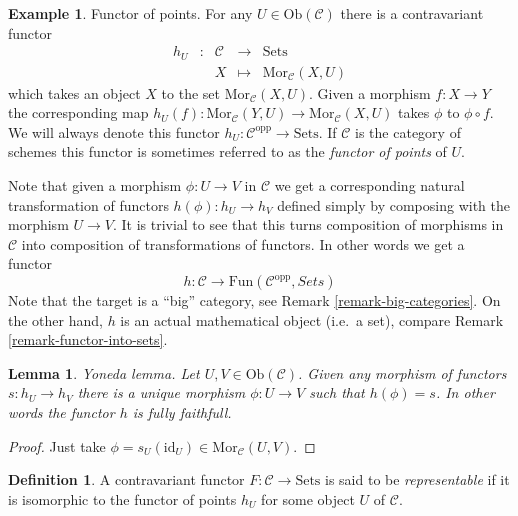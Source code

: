 \documentclass{amsart}
\newtheorem{lemma}[theorem]{Lemma}
\theoremstyle{definition}
\newtheorem{definition}[theorem]{Definition}
\newtheorem{example}[theorem]{Example}
\theoremstyle{remark}
\numberwithin{equation}{subsection}
\begin{document}
\begin{example}
\label{example-hom-functor}
Functor of points.
For any $U\in \text{Ob}(\mathcal{C})$ there is a contravariant
functor 
$$
\begin{matrix}
h_U & : & \mathcal{C} 
&
\longrightarrow
&
\text{Sets} \\
&&
X
&
\longmapsto
&
\text{Mor}_{\mathcal{C}}(X,U) 
\end{matrix}
$$
which takes an object $X$ to the set
$\text{Mor}_{\mathcal{C}}(X,U)$.
Given a morphism $f\colon X\to Y$ the corresponding map
$h_U(f)\colon
\text{Mor}_{\mathcal{C}}(Y,U)\to \text{Mor}_{\mathcal{C}}(X,U)$ takes
$\phi$ to $\phi\circ f$. We will always denote
this functor $h_U : \mathcal{C}^{\text{opp}} \to \text{Sets}$.
If $\mathcal{C}$ is the category of schemes this functor is
sometimes referred to as the
\emph{functor of points} of $U$.
\end{example}

\noindent
Note that given a morphism $\phi : U \to V$ in $\mathcal{C}$ we get a
corresponding natural transformation of functors
$h(\phi) : h_U \to h_V$ defined simply by composing with the morphism
$U \to V$. It is trivial to see that this turns
composition of morphisms in $\mathcal{C}$ into composition of
transformations of functors. In other words we get a functor
$$
h :
\mathcal{C}
\longrightarrow
\text{Fun}(\mathcal{C}^{\text{opp}}, \textit{Sets})
$$
Note that the target is a ``big'' category, see
Remark \ref{remark-big-categories}. On the other hand,
$h$ is an actual mathematical object (i.e.\ a set), compare Remark
\ref{remark-functor-into-sets}.

\begin{lemma}
\label{lemma-yoneda}
Yoneda lemma.
Let $U,V \in \text{Ob}(\mathcal{C})$.
Given any morphism of functors $s : h_U \to h_V$
there is a unique morphism $\phi : U \to V$
such that $h(\phi) = s$. In other words the
functor $h$ is fully faithfull.
\end{lemma}

\begin{proof}
Just take $\phi = s_U(\text{id}_U) \in \text{Mor}_{\mathcal{C}}(U,V)$.
\end{proof}

\begin{definition}
\label{definition-representable-functor}
A contravariant functor $F : \mathcal{C}\to \text{Sets}$ is said
to be {\it representable} if it is isomorphic to the functor of
points $h_U$ for some object $U$ of $\mathcal{C}$.
\end{definition}
\end{document}
